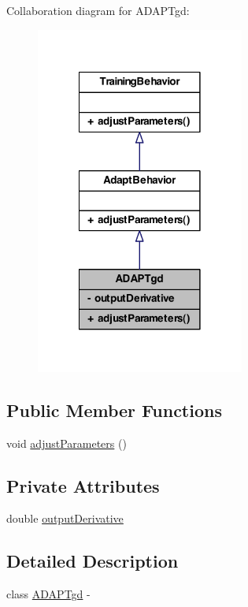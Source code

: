 Collaboration diagram for ADAPTgd:
\nopagebreak
\begin{figure}[H]
\begin{center}
\leavevmode
\includegraphics[width=194pt]{class_a_d_a_p_tgd__coll__graph}
\end{center}
\end{figure}
\subsection*{Public Member Functions}
\begin{DoxyCompactItemize}
\item 
void \hyperlink{class_a_d_a_p_tgd_a61a992390f1994694918254eb49226a8}{adjustParameters} ()
\end{DoxyCompactItemize}
\subsection*{Private Attributes}
\begin{DoxyCompactItemize}
\item 
double \hyperlink{class_a_d_a_p_tgd_a1da50586ed84654472e3c73be57775c6}{outputDerivative}
\end{DoxyCompactItemize}


\subsection{Detailed Description}
class \hyperlink{class_a_d_a_p_tgd}{ADAPTgd} -\/ 

